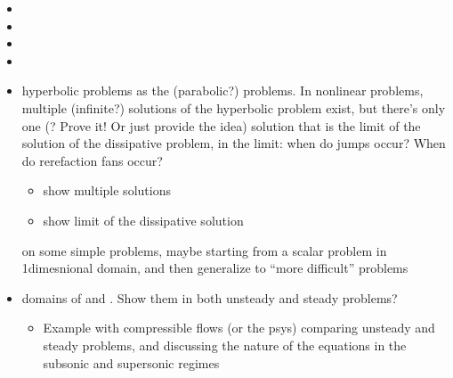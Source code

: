 \documentclass[letterpaper,10pt,english]{jupyterBook}
\begin{document}
\sphinxAtStartPar
{}
\begin{itemize}
\item {} 
\sphinxAtStartPar
{}

\item {} 
\sphinxAtStartPar
{}

\item {} 
\sphinxAtStartPar
{}

\item {} 
\sphinxAtStartPar
{}

\end{itemize}

\sphinxAtStartPar
{}
\begin{itemize}
\item {} 
\sphinxAtStartPar
hyperbolic problems as the  (parabolic?) problems. In non\sphinxhyphen{}linear problems, multiple (infinite?) solutions of the hyperbolic problem exist, but there’s only one (? Prove it! Or just provide the idea) solution that is the limit of the solution of the dissipative problem, in the  limit: when do jumps occur? When do rerefaction fans occur?
\begin{itemize}
\item {} 
\sphinxAtStartPar
show multiple solutions

\item {} 
\sphinxAtStartPar
show limit of the dissipative solution

\end{itemize}

\sphinxAtStartPar
on some simple problems, maybe starting from a scalar problem in 1\sphinxhyphen{}dimesnional domain, and then generalize to “more difficult” problems

\item {} 
\sphinxAtStartPar
domains of  and . Show them in both unsteady and steady problems?
\begin{itemize}
\item {} 
\sphinxAtStartPar
Example with compressible flows (or the p\sphinxhyphen{}sys) comparing unsteady and steady problems, and discussing the nature of the equations in the subsonic and supersonic regimes

\end{itemize}

\end{itemize}
\end{document}
